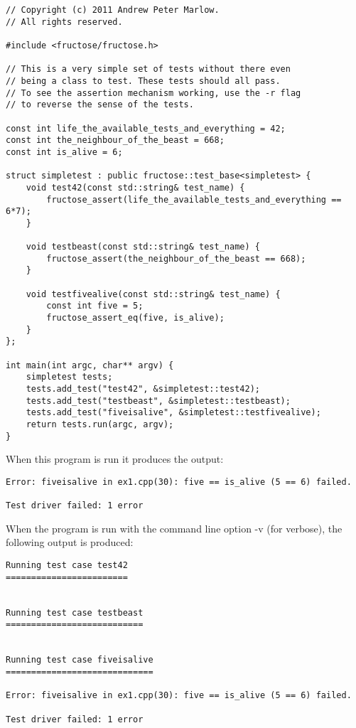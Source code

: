 \documentclass{book}
\begin{document}
\begin{verbatim}
// Copyright (c) 2011 Andrew Peter Marlow.
// All rights reserved.

#include <fructose/fructose.h>

// This is a very simple set of tests without there even 
// being a class to test. These tests should all pass.
// To see the assertion mechanism working, use the -r flag
// to reverse the sense of the tests.

const int life_the_available_tests_and_everything = 42;
const int the_neighbour_of_the_beast = 668;
const int is_alive = 6;

struct simpletest : public fructose::test_base<simpletest> {
    void test42(const std::string& test_name) {
        fructose_assert(life_the_available_tests_and_everything == 6*7);
    }

    void testbeast(const std::string& test_name) {
        fructose_assert(the_neighbour_of_the_beast == 668);
    }

    void testfivealive(const std::string& test_name) {
        const int five = 5;
        fructose_assert_eq(five, is_alive);
    }
};

int main(int argc, char** argv) {
    simpletest tests;
    tests.add_test("test42", &simpletest::test42);
    tests.add_test("testbeast", &simpletest::testbeast);
    tests.add_test("fiveisalive", &simpletest::testfivealive);
    return tests.run(argc, argv);
}
\end{verbatim}

When this program is run it produces the output:

\begin{verbatim}
Error: fiveisalive in ex1.cpp(30): five == is_alive (5 == 6) failed.

Test driver failed: 1 error
\end{verbatim}

When the program is run with the command line option -v (for verbose), 
the following output is produced:

\begin{verbatim}
Running test case test42
========================


Running test case testbeast
===========================


Running test case fiveisalive
=============================

Error: fiveisalive in ex1.cpp(30): five == is_alive (5 == 6) failed.

Test driver failed: 1 error
\end{verbatim}
\end{document}
